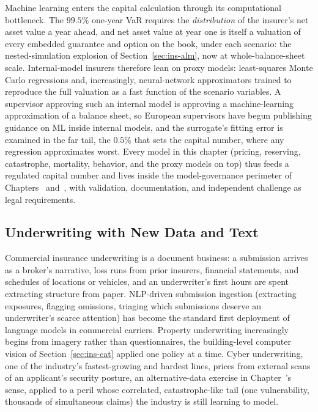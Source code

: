 \documentclass[../ai_in_finance]{subfiles}
\begin{document}
Machine learning enters the capital calculation through its computational bottleneck. The $99.5\%$ one-year VaR requires the \emph{distribution} of the insurer's net asset value a year ahead, and net asset value at year one is itself a valuation of every embedded guarantee and option on the book, under each scenario: the nested-simulation explosion of Section~\ref{sec:ins-alm}, now at whole-balance-sheet scale. Internal-model insurers therefore lean on proxy models: least-squares Monte Carlo regressions and, increasingly, neural-network approximators trained to reproduce the full valuation as a fast function of the scenario variables. A supervisor approving such an internal model is approving a machine-learning approximation of a balance sheet, so European supervisors have begun publishing guidance on ML inside internal models, and the surrogate's fitting error is examined in the far tail, the $0.5\%$ that sets the capital number, where any regression approximates worst. Every model in this chapter (pricing, reserving, catastrophe, mortality, behavior, and the proxy models on top) thus feeds a regulated capital number and lives inside the model-governance perimeter of Chapters~ and~, with validation, documentation, and independent challenge as legal requirements.

\subsection{Underwriting with New Data and Text}
\label{sec:ins-underwriting}

Commercial insurance underwriting is a document business: a submission arrives as a broker's narrative, loss runs from prior insurers, financial statements, and schedules of locations or vehicles, and an underwriter's first hours are spent extracting structure from paper. NLP-driven submission ingestion (extracting exposures, flagging omissions, triaging which submissions deserve an underwriter's scarce attention) has become the standard first deployment of language models in commercial carriers. Property underwriting increasingly begins from imagery rather than questionnaires, the building-level computer vision of Section~\ref{sec:ins-cat} applied one policy at a time. Cyber underwriting, one of the industry's fastest-growing and hardest lines, prices from external scans of an applicant's security posture, an alternative-data exercise in Chapter~'s sense, applied to a peril whose correlated, catastrophe-like tail (one vulnerability, thousands of simultaneous claims) the industry is still learning to model.
\end{document}
